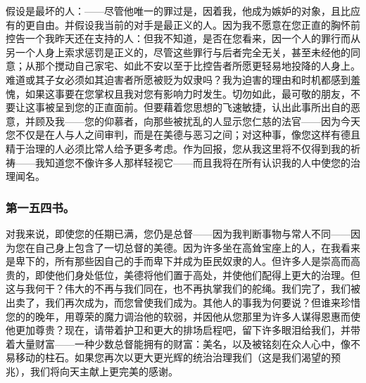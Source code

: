 假设是最坏的人：——尽管他唯一的罪过是，因着我，他成为嫉妒的对象，且比应有的更自由。并假设我当前的对手是最正义的人。因为我不愿意在您正直的胸怀前控告一个我昨天还在支持的人：但我不知道，是否在您看来，因一个人的罪行而从另一个人身上索求惩罚是正义的，尽管这些罪行与后者完全无关，甚至未经他的同意；从那个搅动自己家宅、如此不安以至于比控告者所愿更轻易地投降的人身上。难道或其子女必须如其迫害者所愿被贬为奴隶吗？我为迫害的理由和时机都感到羞愧，如果这事要在您掌权且我对您有影响力时发生。切勿如此，最可敬的朋友，不要让这事被呈到您的正直面前。但要藉着您思想的飞速敏捷，认出此事所出自的恶意，并顾及我——您的仰慕者，向那些被扰乱的人显示您仁慈的法官——因为今天您不仅是在人与人之间审判，而是在美德与恶习之间；对这种事，像您这样有德且精于治理的人必须比常人给予更多考虑。作为回报，您从我这里将不仅得到我的祈祷——我知道您不像许多人那样轻视它——而且我将在所有认识我的人中使您的治理闻名。\par


\subsubsection{第一五四书。}

对我来说，即使您的任期已满，您仍是总督——因为我判断事物与常人不同——因为您在自己身上包含了一切总督的美德。因为许多坐在高耸宝座上的人，在我看来是卑下的，所有那些因自己的手而卑下并成为臣民奴隶的人。但许多人是崇高而高贵的，即使他们身处低位，美德将他们置于高处，并使他们配得上更大的治理。但这与我何干？伟大的不再与我们同在，也不再执掌我们的舵绳。我们完了，我们被出卖了，我们再次成为，而您曾使我们成为。其他人的事我为何要说？但谁来珍惜您的的晚年，用尊荣的魔力调治他的软弱，并因他从您那里为许多人谋得恩惠而使他更加尊贵？现在，请带着护卫和更大的排场启程吧，留下许多眼泪给我们，并带着大量财富——一种少数总督能拥有的财富：美名，以及被铭刻在众人心中，像不易移动的柱石。如果您再次以更大更光辉的统治治理我们（这是我们渴望的预兆），我们将向天主献上更完美的感谢。\par

